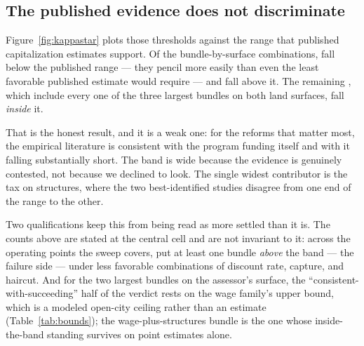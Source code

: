 \documentclass[11pt]{article}
\begin{document}
\begin{table}[htbp]\centering
  \caption{Published bounds on $\kappa$ by tax family. $\dagger$ marks the one bound the
  source record flags as transferred from a different tax. The others are studies of the same
  \emph{kind} of tax, which is not always the same instrument: the third family's bounds come
  from work on state corporate taxes and are applied here to a school income tax, a use tax
  and a transfer tax.}
  \label{tab:bounds}
  \small
  
\end{table}

\subsection{The published evidence does not discriminate}

Figure~\ref{fig:kappastar} plots those thresholds against the range that published
capitalization estimates support. Of the \StxCellsTotal{} bundle-by-surface combinations,
\StxCellsBelowBand{} fall below the published range --- they pencil more easily than even the
least favorable published estimate would require --- and \StxCellsAboveBand{} fall above it.
The remaining \StxCellsInsideBand{}, which include every one of the three largest bundles on
both land surfaces, fall \emph{inside} it.

That is the honest result, and it is a weak one: for the reforms that matter most, the
empirical literature is consistent with the program funding itself and with it falling
substantially short. The band is wide because the evidence is genuinely contested, not because
we declined to look. The single widest contributor is the tax on structures, where the two
best-identified studies disagree from one end of the range to the other.

Two qualifications keep this from being read as more settled than it is. The counts above are
stated at the central cell and are not invariant to it: across the \StxOpPointsTotal{}
operating points the sweep covers, \StxOpPointsAnyAbove{} put at least one bundle \emph{above}
the band --- the failure side --- under less favorable combinations of discount rate, capture,
and haircut. And for the two largest bundles on the assessor's surface, the
``consistent-with-succeeding'' half of the verdict rests on the wage family's upper bound,
which is a modeled open-city ceiling rather than an estimate
(Table~\ref{tab:bounds}); the wage-plus-structures bundle is the one whose inside-the-band
standing survives on point estimates alone.
\end{document}
